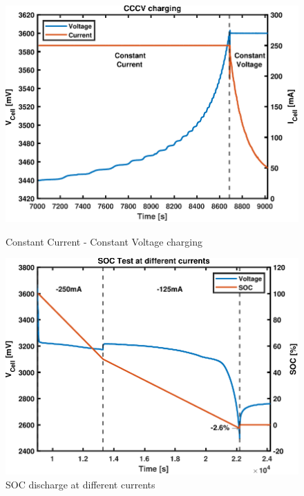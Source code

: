\documentclass[10pt,twoside]{article}
\begin{document}
\begin{figure}[hbt!]
  \centering
  \begin{minipage}[b]{0.49\textwidth}
    \includegraphics[width=\textwidth]{CCCV.pdf}
    \caption{Constant Current - Constant Voltage charging}
    \label{fig:TestCCCV}
  \end{minipage}
  \hfill
  \begin{minipage}[b]{0.49\textwidth}
    \includegraphics[width=\textwidth]{SOC.pdf}
    \caption{SOC discharge at different currents}
    \label{fig:TestSOC}
  \end{minipage}
\end{figure}
\end{document}
